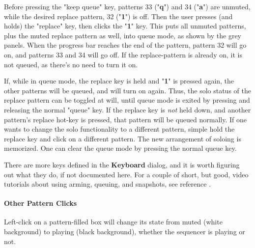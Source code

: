 
   Before pressing the "keep queue" key, patterns 33 ("\textbf{q}")
   and 34 ("\textbf{a}") are
   unmuted, while the desired replace pattern, 32 ("\textbf{1}") is off.
   Then the user presses (and holds) the "replace" key, then clicks the
   "\textbf{1}" key.
   This puts all unmuted patterns, plus the muted
   replace pattern as well, into queue mode, as shown by the grey panels.
   When the progress bar reaches the end of the pattern, pattern 32 will go on,
   and patterns 33 and 34 will go off.
   If the replace-pattern is already on, it is not queued, as
   there's no need to turn it on.

   If, while in queue mode, the replace key is held and
   "\textbf{1}" is pressed again,
   the other patterns will be queued, and will turn on again.  Thus, the
   solo status of the replace pattern can be toggled at will, until queue mode
   is exited by pressing and releasing the normal "queue" key.
   If the replace key is \textsl{not} held down, and another pattern's replace
   hot-key is pressed, that pattern will be queued normally.
   If one wants to change the solo functionality to a different pattern,
   simple hold the replace key and click on a different pattern.  The new
   arrangement of soloing is memorized.
   One can clear the queue mode by pressing the normal queue key.

   There are more keys defined in the \textbf{Keyboard} dialog, and it is
   worth figuring out what they do, if not documented here.
   For a couple of short, but good, video tutorials about using arming,
   queuing, and snapshots, see reference \cite{wootangent1}.

\paragraph{Other Pattern Clicks}
\label{paragraph:patterns_pattern_clicks}

   Left-click on a pattern-filled box will change its state
   from muted (white background) to playing (black background), whether
   the sequencer is playing or not.

